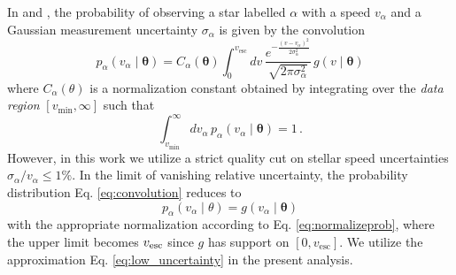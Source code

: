 In \cite{Koppelman2021} and \cite{Necib2022methods}, the probability of observing a star labelled $\alpha$ with a speed $v_\alpha$ and a Gaussian measurement uncertainty $\sigma_\alpha$ is given by the convolution 
\begin{equation}\label{eq:convolution}
    p_\alpha\left(v_\alpha \mid \mathbf{\theta}\right) = C_\alpha(\mathbf{\theta}) \int_0^{v_{\mathrm{esc}}} d v \,\frac{e^{-\frac{\left(v-v_\alpha\right)^2}{2 \sigma_\alpha^2}}}{\sqrt{2 \pi \sigma_\alpha^2}}\,g(v \mid \mathbf{\theta})
\end{equation}
where $C_\alpha(\theta)$ is a normalization constant obtained by integrating over the \textit{data region} $[v_{\mathrm{min}},\infty]$ such that
\begin{equation}\label{eq:normalizeprob}
    \int_{v_\mathrm{min}}^{\infty} d v_\alpha\,p_\alpha\left(v_\alpha \mid \mathbf{\theta}\right) = 1\,.
\end{equation}
However, in this work we utilize a strict quality cut on stellar speed uncertainties $\sigma_{\alpha} / v_\alpha \leq 1\%$. In the limit of vanishing relative uncertainty, the probability distribution Eq. \ref{eq:convolution} reduces to 
\begin{equation}\label{eq:low_uncertainty}
p_\alpha (v_\alpha \mid \theta) = g(v_\alpha \mid \mathbf{\theta})
\end{equation}
with the appropriate normalization according to Eq. \ref{eq:normalizeprob}, where the upper limit becomes $v_{\rm{esc}}$ since $g$ has support on $[0,v_{\mathrm{esc}}]$. We utilize the approximation Eq. \ref{eq:low_uncertainty} in the present analysis.

